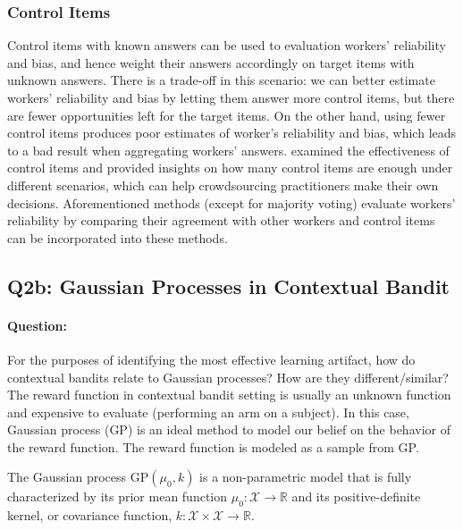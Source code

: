 \documentclass{article}
\begin{document}
\subsubsection{Control Items}
Control items with known answers can be used to evaluation workers'
reliability and bias, and hence weight their answers accordingly on target
items with unknown answers. There is a trade-off in this
scenario: we can better estimate workers' reliability and bias by
letting them answer more control items, but there are fewer
opportunities left for the
target items. On the other hand, using fewer control items produces poor
estimates of worker's reliability and bias, which leads to a bad
result when aggregating workers' answers. \cite{Liu2013-ck} examined
the effectiveness of control items and provided insights on how many control items are enough under
different scenarios, which can help crowdsourcing practitioners make
their own decisions. Aforementioned methods
(except for majority voting) evaluate workers' reliability by
comparing their agreement with other workers and control items can be
incorporated into these methods.

\subsection{Q2b: Gaussian Processes in Contextual
  Bandit}\label{sect:gp}
\paragraph{Question:} For the purposes of identifying the most effective
learning artifact, how do contextual bandits relate to Gaussian
processes? How are they different/similar? \\ [0.1 in]

The reward function in contextual bandit setting is usually an unknown
function and expensive to evaluate (performing an arm on a
subject). In this case, Gaussian process (GP) is an ideal method to model
our belief on the behavior of the reward function. The reward function
is modeled as a sample from GP.

The Gaussian process $\mathrm{GP}(\mu_0,k)$ is a non-parametric model
that is fully characterized by its prior mean function $\mu_0 :
\mathcal{X}\rightarrow \mathbb{R}$ and its positive-definite kernel,
or covariance function, $k: \mathcal{X} \times \mathcal{X} \rightarrow
\mathbb{R}$.
\end{document}
